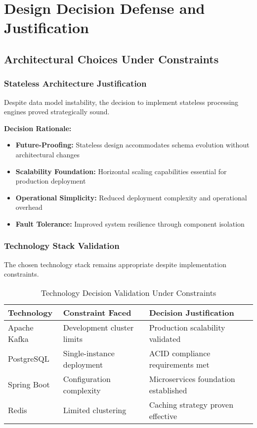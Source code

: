 \section{Design Decision Defense and Justification}

\subsection{Architectural Choices Under Constraints}

\subsubsection{Stateless Architecture Justification}

Despite data model instability, the decision to implement stateless processing engines proved strategically sound.

\textbf{Decision Rationale:}
\begin{itemize}
    \item \textbf{Future-Proofing:} Stateless design accommodates schema evolution without architectural changes
    \item \textbf{Scalability Foundation:} Horizontal scaling capabilities essential for production deployment
    \item \textbf{Operational Simplicity:} Reduced deployment complexity and operational overhead
    \item \textbf{Fault Tolerance:} Improved system resilience through component isolation
\end{itemize}

\subsubsection{Technology Stack Validation}

The chosen technology stack remains appropriate despite implementation constraints.

\begin{table}[h]
\centering
\begin{tabular}{|l|l|l|}
\hline
\textbf{Technology} & \textbf{Constraint Faced} & \textbf{Decision Justification} \\
\hline
Apache Kafka & Development cluster limits & Production scalability validated \\
PostgreSQL & Single-instance deployment & ACID compliance requirements met \\
Spring Boot & Configuration complexity & Microservices foundation established \\
Redis & Limited clustering & Caching strategy proven effective \\
\hline
\end{tabular}
\caption{Technology Decision Validation Under Constraints}
\end{table}

